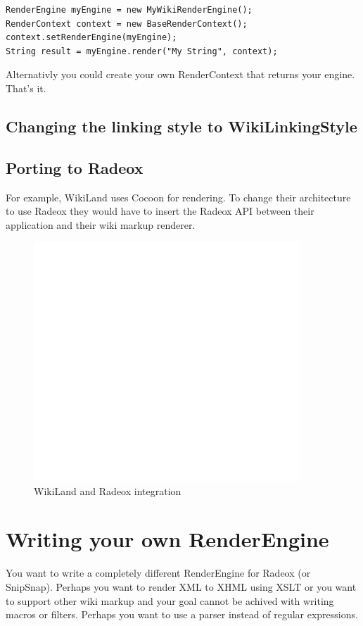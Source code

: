 \documentclass[a4paper,pdftex]{article}
\begin{document}
\begin{verbatim}
RenderEngine myEngine = new MyWikiRenderEngine();
RenderContext context = new BaseRenderContext();
context.setRenderEngine(myEngine);
String result = myEngine.render("My String", context);
\end{verbatim}

Alternativly  you could create your own RenderContext that returns your engine. That's it.

\subsection{Changing the linking style to WikiLinkingStyle}

\subsection{Porting to Radeox}

For example, WikiLand uses Cocoon for rendering. To change their architecture
to use Radeox they would have to insert the Radeox API between their application
and their wiki markup renderer. 

\begin{figure}[ht]
  \centering
    \includegraphics[keepaspectratio,width=10cm]{images/WikiLand}
     \caption{\small\textsf WikiLand and Radeox integration}
\end{figure}


\section{Writing your own RenderEngine}

You want to write a completely different RenderEngine for 
Radeox (or SnipSnap). Perhaps you want to render XML to XHML 
using XSLT or you want to support other wiki markup and your goal 
cannot be achived with writing macros or filters.
Perhaps you want to use a parser instead of regular expressions.
\end{document}
